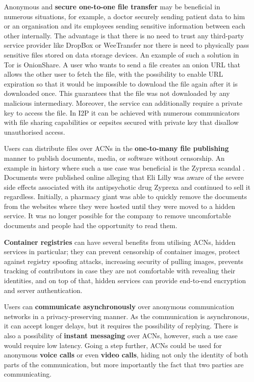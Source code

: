 Anonymous and \textbf{secure one-to-one file transfer} may be beneficial in numerous situations, for example, a doctor securely sending patient data to him or an organisation and its employees sending sensitive information between each other internally. The advantage is that there is no need to trust any third-party service provider like DropBox or WeeTransfer nor there is need to physically pass sensitive files stored on data storage devices.
An example of such a solution in Tor is OnionShare. A user who wants to send a file creates an onion URL that allows the other user to fetch the file, with the possibility to enable URL expiration so that it would be impossible to download the file again after it is downloaded once. This guarantees that the file was not downloaded by any malicious intermediary. Moreover, the service can additionally require a private key to access the file. In I2P it can be achieved with numerous communicators with file sharing capabilities or eepsites secured with private key that disallow unauthorised access.

Users can distribute files over ACNs in the \textbf{one-to-many file publishing} manner to publish documents, media, or software without censorship. An example in history where such a use case was beneficial is the Zyprexa scandal \cite{zyprexa}. Documents were published online alleging that Eli Lilly was aware of the severe side effects associated with its antipsychotic drug Zyprexa and continued to sell it regardless. Initially, a pharmacy giant was able to quickly remove the documents from the websites where they were hosted until they were moved to a hidden service. It was no longer possible for the company to remove uncomfortable documents and people had the opportunity to read them.

\textbf{Container registries} can have several benefits from utilising ACNs, hidden services in particular; they can prevent censorship of container images, protect against registry spoofing attacks, increasing security of pulling images, prevents tracking of contributors in case they are not comfortable with revealing their identities, and on top of that, hidden services can provide end-to-end encryption and server authentication.

Users can \textbf{communicate asynchronously} over anonymous communication networks in a privacy-preserving manner. As the communication is asynchronous, it can accept longer delays, but it requires the possibility of replying. There is also a possibility of \textbf{instant messaging} over ACNs, however, such a use case would require low latency. Going a step further, ACNs could be used for anonymous \textbf{voice calls} or even \textbf{video calls}, hiding not only the identity of both parts of the communication, but more importantly the fact that two parties are communicating.

